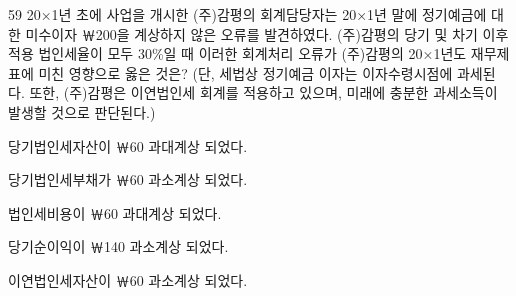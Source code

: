 \begin{question}{59}
20×1년 초에 사업을 개시한 (주)감평의 회계담당자는 20×1년 말에 정기예금에 대한 미수이자 ￦200을 계상하지 않은 오류를 발견하였다. (주)감평의 당기 및 차기 이후 적용 법인세율이 모두 30\%일 때 이러한 회계처리 오류가 (주)감평의 20×1년도 재무제표에 미친 영향으로 옳은 것은? (단, 세법상 정기예금 이자는 이자수령시점에 과세된다. 또한, (주)감평은 이연법인세 회계를 적용하고 있으며, 미래에 충분한 과세소득이 발생할 것으로 판단된다.)
\begin{choices}
  \item 당기법인세자산이 ￦60 과대계상 되었다.
  \item 당기법인세부채가 ￦60 과소계상 되었다.
  \item 법인세비용이 ￦60 과대계상 되었다.
  \item 당기순이익이 ￦140 과소계상 되었다.
  \item 이연법인세자산이 ￦60 과소계상 되었다.
\end{choices}
\end{question}
